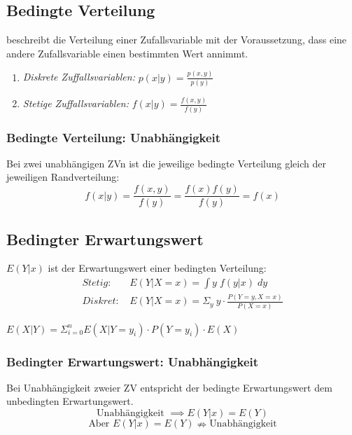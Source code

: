 \documentclass[a3paper, 8pt]{extarticle}
\begin{document}
\begin{multicols*}{5}




\subsection{Bedingte Verteilung}
beschreibt die Verteilung einer Zufallsvariable mit der Voraussetzung, dass eine andere Zufallsvariable einen bestimmten Wert annimmt.
\vspace{3pt}
\begin{enumerate}
    \item[] \textit{Diskrete Zuffallsvariablen:} $p(x|y)=\frac{p(x,y)}{p(y)}$
    \item[] \textit{Stetige Zuffallsvariablen:} $f(x|y)=\frac{f(x,y)}{f(y)}$
\end{enumerate}


\subsubsection{Bedingte Verteilung: Unabhängigkeit}Bei zwei unabhängigen ZVn ist die jeweilige bedingte Verteilung gleich der jeweiligen Randverteilung:    \vspace{3pt}\\
    $$f(x|y)=\frac{f(x,y)}{f(y)}=\frac{f(x)f(y)}{f(y)}=f(x)$$
    
\subsection{Bedingter Erwartungswert}
$E(Y|x)$ ist der Erwartungswert einer bedingten Verteilung: \begin{align*}
   \textit{Stetig: } & E(Y|X=x)=\int y\;f(y|x)\;dy\\
\textit{Diskret: } & E(Y|X=x)=\Sigma_y \ y \cdot \frac{P(Y=y, X=x)}{P(X=x)}
\end{align*}

$E(X|Y)=\Sigma^n_{i=0} E(X|Y=y_i)\cdot P(Y=y_i) \cdot E(X)$


\subsubsection{Bedingter Erwartungswert: Unabhängigkeit} Bei Unabhängigkeit zweier ZV entspricht der bedingte Erwartungswert dem unbedingten Erwartungswert.
$$\text{Unabhängigkeit }\implies E(Y|x) = E(Y)$$
$$ \text{Aber }E(Y|x) = E(Y) \nRightarrow \text{Unabhängigkeit}$$


\end{multicols*}
\end{document}
